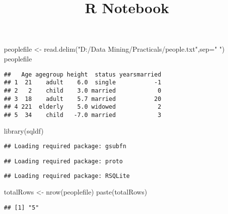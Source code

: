 \documentclass[
]{article}
\title{R Notebook}
\author{}
\date{\vspace{-2.5em}}
\newenvironment{Shaded}{\begin{snugshade}}{\end{snugshade}}
\newcommand{\AttributeTok}[1]{\textcolor[rgb]{0.77,0.63,0.00}{#1}}
\newcommand{\FunctionTok}[1]{\textcolor[rgb]{0.00,0.00,0.00}{#1}}
\newcommand{\NormalTok}[1]{#1}
\newcommand{\OtherTok}[1]{\textcolor[rgb]{0.56,0.35,0.01}{#1}}
\newcommand{\StringTok}[1]{\textcolor[rgb]{0.31,0.60,0.02}{#1}}
\begin{document}
\maketitle

\begin{Shaded}
\begin{Highlighting}[]
\NormalTok{peoplefile }\OtherTok{\textless{}{-}} \FunctionTok{read.delim}\NormalTok{(}\StringTok{"D:/Data Mining/Practicals/people.txt"}\NormalTok{,}\AttributeTok{sep=}\StringTok{" "}\NormalTok{)}
\NormalTok{peoplefile}
\end{Highlighting}
\end{Shaded}

\begin{verbatim}
##   Age agegroup height  status yearsmarried
## 1  21    adult    6.0  single           -1
## 2   2    child    3.0 married            0
## 3  18    adult    5.7 married           20
## 4 221  elderly    5.0 widowed            2
## 5  34    child   -7.0 married            3
\end{verbatim}

\begin{Shaded}
\begin{Highlighting}[]
\FunctionTok{library}\NormalTok{(sqldf)}
\end{Highlighting}
\end{Shaded}

\begin{verbatim}
## Loading required package: gsubfn
\end{verbatim}

\begin{verbatim}
## Loading required package: proto
\end{verbatim}

\begin{verbatim}
## Loading required package: RSQLite
\end{verbatim}

\begin{Shaded}
\begin{Highlighting}[]
\NormalTok{totalRows }\OtherTok{\textless{}{-}} \FunctionTok{nrow}\NormalTok{(peoplefile)}
\FunctionTok{paste}\NormalTok{(totalRows)}
\end{Highlighting}
\end{Shaded}

\begin{verbatim}
## [1] "5"
\end{verbatim}
\end{document}
